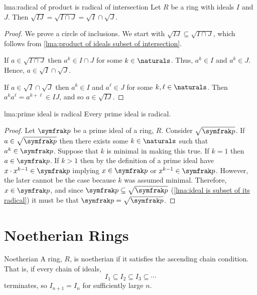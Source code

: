 \begin{lma}{}{lma:radical of product is radical of intersection}
    Let \(R\) be a ring with ideals \(I\) and \(J\).
    Then \(\sqrt{IJ} = \sqrt{I \cap J} = \sqrt{I} \cap \sqrt{J}\).
    \begin{proof}
        We prove a circle of inclusions.
        We start with \(\sqrt{IJ} \subseteq \sqrt{I \cap J}\), which follows from \cref{lma:product of ideals subset of intersection}.
        
        If \(a \in \sqrt{I \cap J}\) then \(a^k \in I \cap J\) for some \(k \in \naturals\).
        Thus, \(a^k \in I\) and \(a^k \in J\).
        Hence, \(a \in \sqrt{I} \cap \sqrt{J}\).
        
        If \(a \in \sqrt{I} \cap \sqrt{J}\) then \(a^k \in I\) and \(a^{\ell} \in J\) for some \(k, \ell \in \naturals\).
        Then \(a^k a^{\ell} = a^{k + \ell} \in IJ\), and so \(a \in \sqrt{IJ}\).
    \end{proof}
\end{lma}

\begin{lma}{}{lma:prime ideal is radical}
    Every prime ideal is radical.
    \begin{proof}
        Let \(\ideal{p}\) be a prime ideal of a ring, \(R\).
        Consider \(\sqrt{\ideal{p}}\).
        If \(a \in \sqrt{\ideal{p}}\) then there exists some \(k \in \naturals\) such that \(a^k \in \ideal{p}\).
        Suppose that \(k\) is minimal in making this true.
        If \(k = 1\) then \(a \in \ideal{p}\).
        If \(k > 1\) then by the definition of a prime ideal have \(x \cdot x^{k-1} \in \ideal{p}\) implying \(x \in \ideal{p}\) or \(x^{k-1} \in \ideal{p}\).
        However, the later cannot be the case because \(k\) was assumed minimal.
        Therefore, \(x \in \ideal{p}\), and since \(\ideal{p} \subseteq \sqrt{\ideal{p}}\) (\cref{lma:ideal is subset of its radical}) it must be that \(\ideal{p} = \sqrt{\ideal{p}}\).
    \end{proof}
\end{lma}

\section{Noetherian Rings}
\begin{dfn}{Noetherian}{}
    A ring, \(R\), is noetherian if it satisfies the ascending chain condition.
    That is, if every chain of ideals,
    \begin{equation}
        I_1 \subseteq I_2 \subseteq I_3 \subseteq \dotsb
    \end{equation}
    terminates, so \(I_{n+1} = I_n\) for sufficiently large \(n\).
\end{dfn}

